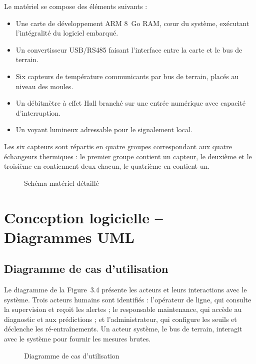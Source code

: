 Le matériel se compose des éléments suivants :

\begin{itemize}
  \item Une carte de développement ARM 8~Go RAM, cœur du système, exécutant l'intégralité du logiciel embarqué.
  \item Un convertisseur USB/RS485 faisant l'interface entre la carte et le bus de terrain.
  \item Six capteurs de température communicants par bus de terrain, placés au niveau des moules.
  \item Un débitmètre à effet Hall branché sur une entrée numérique avec capacité d'interruption.
  \item Un voyant lumineux adressable pour le signalement local.
\end{itemize}

Les six capteurs sont répartis en quatre groupes correspondant aux quatre échangeurs thermiques : le premier groupe contient un capteur, le deuxième et le troisième en contiennent deux chacun, le quatrième en contient un.

\begin{figure}[htbp]
  \centering
  \caption{Schéma matériel détaillé}
\end{figure}

\section{Conception logicielle -- Diagrammes UML}

\subsection{Diagramme de cas d'utilisation}

Le diagramme de la Figure~3.4 présente les acteurs et leurs interactions avec le système. Trois acteurs humains sont identifiés : l'opérateur de ligne, qui consulte la supervision et reçoit les alertes ; le responsable maintenance, qui accède au diagnostic et aux prédictions ; et l'administrateur, qui configure les seuils et déclenche les ré-entraînements. Un acteur système, le bus de terrain, interagit avec le système pour fournir les mesures brutes.

\begin{figure}[htbp]
  \centering
  \caption{Diagramme de cas d'utilisation}
\end{figure}

